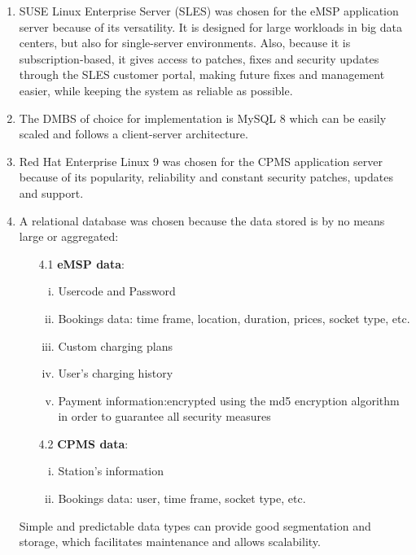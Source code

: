\documentclass[12pt]{report}
\begin{document}
\begin{enumerate}
    \item SUSE Linux Enterprise Server (SLES) was chosen for the eMSP application server because of its versatility. It is designed for large workloads in big data centers, but also for single-server environments. Also, because it is subscription-based, it gives access to patches, fixes and security updates through the SLES customer portal, making future fixes and management easier, while keeping the system as reliable as possible.\\
    \item The DMBS of choice for implementation is MySQL 8 which can be easily scaled and follows a client-server architecture.\\
    \item Red Hat Enterprise Linux 9 was chosen for the CPMS application server because of its popularity, reliability and constant security patches, updates and support.
    \item A relational database was chosen because the data stored is by no means large or aggregated:
    \begin{itemize}
        \item[4.1]\textbf{eMSP data}:
            \begin{enumerate}[i.]
                \item Usercode and Password
                \item Bookings data: time frame, location, duration, prices, socket type, etc.
                \item Custom charging plans
                \item User's charging history
                \item Payment information:encrypted using the md5 encryption algorithm in order to guarantee all security measures
            \end{enumerate}
        \item[4.2]\textbf{CPMS data}:
            \begin{enumerate}[i.]
                \item Station's information
                \item Bookings data: user, time frame, socket type, etc.
            \end{enumerate}
    \end{itemize}
    Simple and predictable data types can provide good segmentation and storage, which facilitates maintenance and allows scalability.
\end{enumerate}
\end{document}
